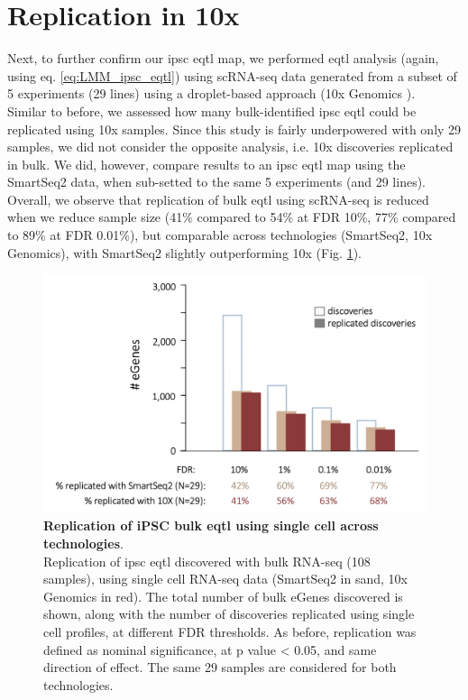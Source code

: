 \newpage

\section{Replication in 10x}

Next, to further confirm our \gls{ipsc} \gls{eqtl} map, we performed \gls{eqtl} analysis (again, using eq. \eqref{eq:LMM_ipsc_eqtl}) using scRNA-seq data generated from a subset of 5 experiments (29 lines) using a droplet-based approach (10x Genomics \cite{zheng2017massively}).\\

Similar to before, we assessed how many bulk-identified \gls{ipsc} \gls{eqtl} could be replicated using 10x samples.
Since this study is fairly underpowered with only 29 samples, we did not consider the opposite analysis, i.e. 10x discoveries replicated in bulk.
We did, however, compare results to an \gls{ipsc} \gls{eqtl} map using the SmartSeq2 data, when sub-setted to the same 5 experiments (and 29 lines). \\

Overall, we observe that replication of bulk \gls{eqtl} using scRNA-seq is reduced when we reduce sample size (41\% compared to 54\% at FDR 10\%, 77\% compared to 89\% at FDR 0.01\%), but comparable across technologies (SmartSeq2, 10x Genomics), with SmartSeq2 slightly outperforming 10x (Fig. \ref{fig:sc_bulk_10x_egenes}).

\begin{figure}[h]
\includegraphics[width=14.5cm]{Chapter3/Fig/sc_vs_bulk_vs_10x.png}
\caption[iPSC bulk eQTL replication]{\textbf{Replication of iPSC bulk \gls{eqtl} using single cell across technologies}.\\
Replication of \gls{ipsc} \gls{eqtl} discovered with bulk RNA-seq (108 samples), using single cell RNA-seq data (SmartSeq2 in sand, 10x Genomics in red). 
The total number of bulk eGenes discovered is shown, along with the number of discoveries replicated using single cell profiles, at different FDR thresholds. 
As before, replication was defined as nominal significance, at p value < 0.05, and same direction of effect. 
The same 29 samples are considered for both technologies.}
\label{fig:sc_bulk_10x_egenes}
\end{figure}

